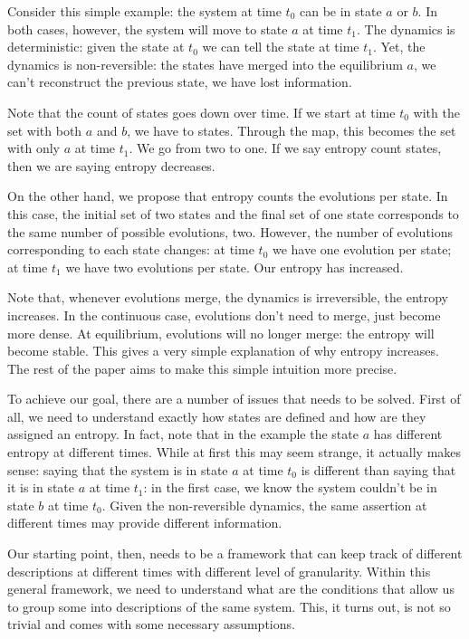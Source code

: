 \documentclass[letterpaper]{article}
\begin{document}
Consider this simple example: the system at time $t_0$ can be in state $a$ or $b$. In both cases, however, the system will move to state $a$ at time $t_1$. The dynamics is deterministic: given the state at $t_0$ we can tell the state at time $t_1$. Yet, the dynamics is non-reversible: the states have merged into the equilibrium $a$, we can't reconstruct the previous state, we have lost information.

Note that the count of states goes down over time. If we start at time $t_0$ with the set with both $a$ and $b$, we have to states. Through the map, this becomes the set with only $a$ at time $t_1$. We go from two to one. If we say entropy count states, then we are saying entropy decreases.

On the other hand, we propose that entropy counts the evolutions per state. In this case, the initial set of two states and the final set of one state corresponds to the same number of possible evolutions, two. However, the number of evolutions corresponding to each state changes: at time $t_0$ we have one evolution per state; at time $t_1$ we have two evolutions per state. Our entropy has increased.

Note that, whenever evolutions merge, the dynamics is irreversible, the entropy increases. In the continuous case, evolutions don't need to merge, just become more dense. At equilibrium, evolutions will no longer merge: the entropy will become stable. This gives a very simple explanation of why entropy increases. The rest of the paper aims to make this simple intuition more precise.

To achieve our goal, there are a number of issues that needs to be solved. First of all, we need to understand exactly how states are defined and how are they assigned an entropy. In fact, note that in the example the state $a$ has different entropy at different times. While at first this may seem strange, it actually makes sense: saying that the system is in state $a$ at time $t_0$ is different than saying that it is in state $a$ at time $t_1$: in the first case, we know the system couldn't be in state $b$ at time $t_0$. Given the non-reversible dynamics, the same assertion at different times may provide different information.

Our starting point, then, needs to be a framework that can keep track of different descriptions at different times with different level of granularity. Within this general framework, we need to understand what are the conditions that allow us to group some into descriptions of the same system. This, it turns out, is not so trivial and comes with some necessary assumptions.
\end{document}
